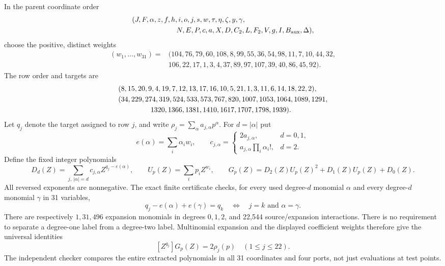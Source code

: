 In the parent coordinate order
\[
\begin{split}
 &(J,F,\alpha,z,f,h,i,o,j,s,w,\tau,\eta,\zeta,y,\gamma,\\
 &\hspace{22mm}N,E,P,c,a,X,D,C_2,L,F_2,V,g,I,B_{\rm aux},\Delta),
\end{split}
\]
choose the positive, distinct weights
\[
\begin{split}
 (w_1,\ldots,w_{31})={}&(104,76,79,60,108,8,99,55,36,54,98,11,7,10,44,32,\\
 &106,22,17,1,3,4,37,89,97,107,39,40,86,45,92).
\end{split}
\]
The row order and targets are
\[
\begin{split}
 &(8,15,20,9,4,19,7,12,13,17,16,10,5,21,1,3,11,6,14,18,22,2),\\
 &(34,229,274,319,524,533,573,767,820,1007,1053,1064,1089,1291,\\
 &\hspace{16mm}1320,1366,1381,1410,1617,1707,1798,1939).
\end{split}
\]
Let $q_j$ denote the target assigned to row $j$, and write
$\rho_j=\sum_\alpha a_{j,\alpha}p^\alpha$. For $d=|\alpha|$ put
\[
 e(\alpha)=\sum_i\alpha_iw_i,\qquad
 c_{j,\alpha}=
 \begin{cases}2a_{j,\alpha},&d=0,1,\\
 a_{j,\alpha}\prod_i\alpha_i!,&d=2.
 \end{cases}
\]
Define the fixed integer polynomials
\[
 D_d(Z)=\sum_{j,\,|\alpha|=d}c_{j,\alpha}Z^{q_j-e(\alpha)},\qquad
 U_p(Z)=\sum_i p_iZ^{w_i},\qquad
 G_p(Z)=D_2(Z)U_p(Z)^2+D_1(Z)U_p(Z)+D_0(Z).
\]
All reversed exponents are nonnegative. The exact finite certificate checks,
for every used degree-$d$ monomial $\alpha$ and every degree-$d$ monomial
$\gamma$ in 31 variables,
\[
 q_j-e(\alpha)+e(\gamma)=q_k
 \quad\Longleftrightarrow\quad j=k\text{ and }\alpha=\gamma.
\]
There are respectively $1,31,496$ expansion monomials in degrees $0,1,2$,
and 22,544 source/expansion interactions. There is no requirement to
separate a degree-one label from a degree-two label. Multinomial expansion
and the displayed coefficient weights therefore give the universal identities
\begin{equation}\label{eq:split-extraction}
 [Z^{q_j}]G_p(Z)=2\rho_j(p)\quad(1\le j\le22).
\end{equation}
The independent checker compares the entire extracted polynomials in all
31 coordinates and four ports, not just evaluations at test points.

